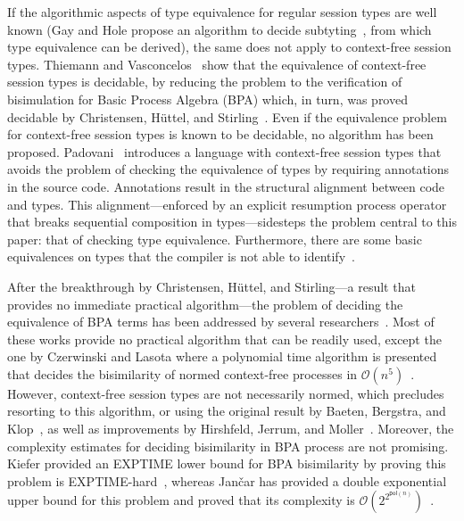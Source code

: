 If the algorithmic aspects of type equivalence for regular session
types are well known (Gay and Hole propose an algorithm to decide
subtyting~\cite{DBLP:journals/acta/GayH05}, from which type
equivalence can be derived), the same does not apply to context-free
session types.
%
Thiemann and Vasconcelos~\cite{thiemann2016context} show that the
equivalence of context-free session types is decidable, by reducing
the problem to the verification of bisimulation for Basic Process
Algebra (BPA) which, in turn, was proved decidable by Christensen,
H{\"{u}}ttel, and Stirling~\cite{DBLP:journals/iandc/ChristensenHS95}.
%
Even if the equivalence problem for context-free session types is
known to be decidable, no algorithm has been proposed.
%
Padovani~\cite{DBLP:conf/esop/Padovani17} introduces a language with
context-free session types that avoids the problem of checking the
equivalence of types by requiring annotations in the source
code. Annotations result in the structural alignment between code and
types. This alignment---enforced by an explicit resumption process
operator that breaks sequential composition in types---sidesteps the
problem central to this paper: that of checking type equivalence.
Furthermore, there are some basic equivalences on types that the
compiler is not able to identify~\cite{DBLP:conf/esop/Padovani17}.

After the breakthrough by Christensen, H\"uttel, and Stirling---a
result that provides no immediate practical algorithm---the problem of
deciding the equivalence of BPA terms has been addressed by several
researchers~\cite{DBLP:conf/mfcs/BurkartCS95,DBLP:journals/iandc/ChristensenHS95,czerwinski2010fast,janvcar1999techniques}.
Most of these works provide no practical algorithm that can be
readily used, except the one by Czerwinski and Lasota where a
polynomial time algorithm is presented that decides the bisimilarity
of normed context-free processes in
$\mathcal{O}(n^5)$~\cite{czerwinski2010fast}.
%
However, context-free session types are not necessarily normed, which
precludes resorting to this algorithm, or using the original result by
Baeten, Bergstra, and Klop~\cite{baeten1993decidability}, as well as
improvements by Hirshfeld, Jerrum, and
Moller~\cite{DBLP:journals/tcs/HirshfeldJM96,DBLP:conf/concur/HirshfeldM94}.
Moreover, the complexity estimates for deciding bisimilarity in BPA
process are not promising. Kiefer provided an EXPTIME lower bound for
BPA bisimilarity by proving this problem is
EXPTIME-hard~\cite{kiefer2013bpa}, whereas Jan\v car has provided a
double exponential upper bound for this problem and proved that its
complexity is
$\mathcal{O}(2^{2^{\mathsf{pol}(n)}})$~\cite{jancar2012bisimilarity}.

